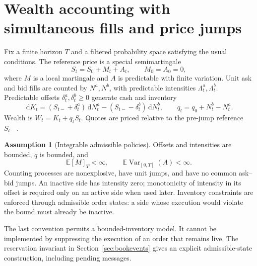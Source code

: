 \documentclass[11pt]{article}
\theoremstyle{plain}
\theoremstyle{definition}
\newtheorem{assumption}[theorem]{Assumption}
\theoremstyle{remark}
\newcommand{\E}{\mathbb E}
\newcommand{\dd}{\,\mathrm d}
\begin{document}
\section{Wealth accounting with simultaneous fills and price jumps}

Fix a finite horizon \(T\) and a filtered probability space satisfying the
usual conditions. The reference price is a special semimartingale
\[
S_t=S_0+M_t+A_t,\qquad M_0=A_0=0,
\]
where \(M\) is a local martingale and \(A\) is predictable with finite
variation. Unit ask and bid fills are counted by \(N^a,N^b\), with
predictable intensities \(\Lambda^a_t,\Lambda^b_t\).
Predictable offsets \(\delta^a_t,\delta^b_t\ge0\) generate cash and inventory
\[
\dd K_t=(S_{t-}+\delta^a_t)\dd N^a_t
        -(S_{t-}-\delta^b_t)\dd N^b_t,\qquad
q_t=q_0+N^b_t-N^a_t.
\]
Wealth is \(W_t=K_t+q_tS_t\). Quotes are priced relative to the pre-jump
reference \(S_{t-}\).

\begin{assumption}[Integrable admissible policies]\label{ass:accounting}
Offsets and intensities are bounded, \(q\) is bounded, and
\[
\E[M]_T<\infty,\qquad
\E\operatorname{Var}_{[0,T]}(A)<\infty.
\]
Counting processes are nonexplosive, have unit jumps, and have no common
ask--bid jumps. An inactive side has intensity zero; monotonicity of
intensity in its offset is required only on an active side when used
later. Inventory constraints are enforced through admissible order
states: a side whose execution would violate the bound must already
be inactive.
\end{assumption}

The last convention permits a bounded-inventory model. It cannot be
implemented by suppressing the execution of an order that remains live.
The reservation invariant in Section~\ref{sec:bookevents} gives an
explicit admissible-state construction, including pending messages.
\end{document}
